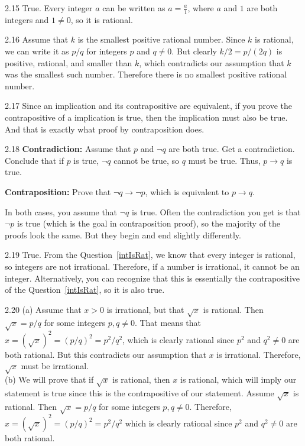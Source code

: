 \begin{RequAnswer}{2.15}
True. Every integer $a$ can be written as $a=\frac{a}{1}$, where $a$ and $1$ are both integers and $1\neq 0$, so it is rational.
\end{RequAnswer}
\begin{RequAnswer}{2.16}
Assume that $k$ is the smallest positive rational number.
Since $k$ is rational, we can write it as $p/q$ for integers
$p$ and $q\neq 0$. But clearly $k/2=p/(2q)$ is positive,
rational, and smaller than $k$, which contradicts our assumption
that $k$ was the smallest such number.
Therefore there is no smallest positive rational number.
\end{RequAnswer}
\begin{RequAnswer}{2.17}
Since an implication and its contrapositive are equivalent, if you prove the contrapositive of a implication is
true, then the implication must also be true. And that is exactly what proof by contraposition does.
\end{RequAnswer}
\begin{RequAnswer}{2.18}
{\bf Contradiction:} Assume that $p$ and $\neg q$ are both true. Get a contradiction.
Conclude that if $p$ is true, $\neg q$ cannot be true, so $q$ must be true. Thus, $p\rightarrow q$ is true.

\noindent
{\bf Contraposition: } Prove that $\neg q\rightarrow \neg p$, which is equivalent to $p\rightarrow q$.

\noindent
In both cases, you assume that $\neg q$ is true. Often the contradiction you get is that $\neg p$
is true (which is the goal in contraposition proof),
so the majority of the proofs look the same. But they begin and end slightly differently.
\end{RequAnswer}
\begin{RequAnswer}{2.19}
True. From the Question~\ref{intIsRat}, we know that every integer is rational, so integers are not irrational.
Therefore, if a number is irrational, it cannot be an integer.
Alternatively, you can recognize that this is essentially the contrapositive of the Question~\ref{intIsRat}, so it is also true.
\end{RequAnswer}
\begin{RequAnswer}{2.20}
(a) Assume that $x>0$ is irrational, but that $\sqrt{x}$ is rational.
Then $\sqrt{x}=p/q$ for some integers $p, q\neq 0$.
That means that $x=(\sqrt{x})^2=(p/q)^2=p^2/q^2$, which
is clearly rational since $p^2$ and $q^2\neq 0$ are both rational.
But this contradicts our assumption that $x$ is irrational.
Therefore, $\sqrt{x}$ must be irrational.\\
(b) We will prove that if $\sqrt{x}$ is rational, then $x$ is rational,
which will imply our statement is true since this is the
contrapositive of our statement.
Assume $\sqrt{x}$ is rational. Then
$\sqrt{x}=p/q$ for some integers $p, q\neq 0$.
Therefore, $x=(\sqrt{x})^2=(p/q)^2=p^2/q^2$
which is clearly rational since $p^2$ and $q^2\neq 0$ are both rational.
\end{RequAnswer}
